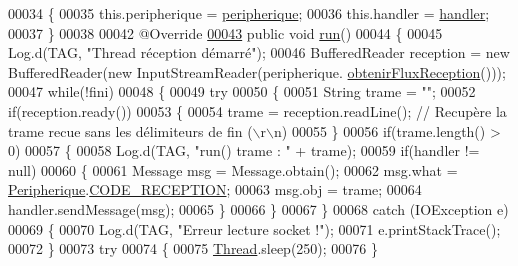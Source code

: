 \begin{DoxyCode}
00034     \{
00035         this.peripherique = \hyperlink{classcom_1_1example_1_1ekawa_1_1_reception_a9f41511c4449d90da78017ca698367ef}{peripherique};
00036         this.handler = \hyperlink{classcom_1_1example_1_1ekawa_1_1_reception_ab6273fbebb5aca17b9f95e275f1d3d38}{handler};
00037     \}
00038 
00042     @Override
\hyperlink{classcom_1_1example_1_1ekawa_1_1_reception_ae5731cf974df539d32bfaded7b29d3c0}{00043}     \textcolor{keyword}{public} \textcolor{keywordtype}{void} \hyperlink{classcom_1_1example_1_1ekawa_1_1_reception_ae5731cf974df539d32bfaded7b29d3c0}{run}()
00044     \{
00045         Log.d(TAG, \textcolor{stringliteral}{"Thread réception démarré"});
00046         BufferedReader reception = \textcolor{keyword}{new} BufferedReader(\textcolor{keyword}{new} InputStreamReader(peripherique.
      \hyperlink{classcom_1_1example_1_1ekawa_1_1_peripherique_a8b88d0a0d9e0c1b1aae04ba7c9d24619}{obtenirFluxReception}()));
00047         \textcolor{keywordflow}{while}(!fini)
00048         \{
00049             \textcolor{keywordflow}{try}
00050             \{
00051                 String trame = \textcolor{stringliteral}{""};
00052                 \textcolor{keywordflow}{if}(reception.ready())
00053                 \{
00054                     trame = reception.readLine(); \textcolor{comment}{// Recupère la trame recue sans les délimiteurs de fin
       (\(\backslash\)r\(\backslash\)n)}
00055                 \}
00056                 \textcolor{keywordflow}{if}(trame.length() > 0)
00057                 \{
00058                     Log.d(TAG, \textcolor{stringliteral}{"run() trame : "} + trame);
00059                     \textcolor{keywordflow}{if}(handler != null)
00060                     \{
00061                         Message msg = Message.obtain();
00062                         msg.what = \hyperlink{classcom_1_1example_1_1ekawa_1_1_peripherique}{Peripherique}.\hyperlink{classcom_1_1example_1_1ekawa_1_1_peripherique_a532f5da1747b68217b8764db9b85e845}{CODE\_RECEPTION};
00063                         msg.obj = trame;
00064                         handler.sendMessage(msg);
00065                     \}
00066                 \}
00067             \}
00068             \textcolor{keywordflow}{catch} (IOException e)
00069             \{
00070                 Log.d(TAG, \textcolor{stringliteral}{"Erreur lecture socket !"});
00071                  e.printStackTrace();
00072             \}
00073             \textcolor{keywordflow}{try}
00074             \{
00075                 \hyperlink{class_thread}{Thread}.sleep(250);
00076             \}

\end{DoxyCode}
